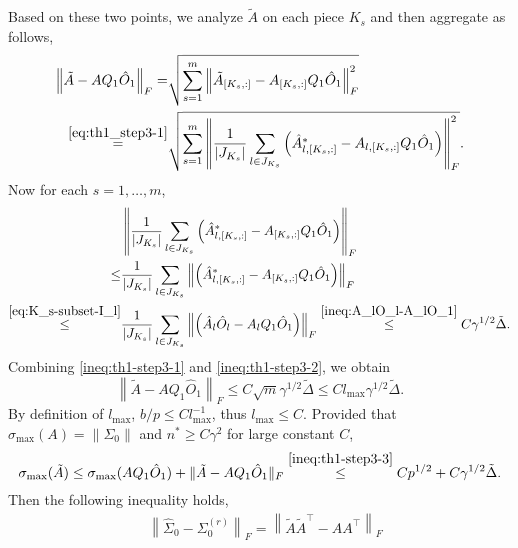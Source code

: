 \documentclass[11pt]{article}
\newcommand{\0}{{\mathbf{0}}}
\newcommand{\1}{{\mathbf{1}}}
\begin{document}
\begin{enumerate}[leftmargin=*]
	Based on these two points, we analyze $\tilde{A}$ on each piece $K_s$ and then aggregate as follows,
	\begin{equation}\label{ineq:th1-step3-1}
	\begin{split}
	\left\|\tilde{A} - A Q_1\hat{O}_1\right\|_F = & \sqrt{\sum_{s=1}^m \left\|\tilde{A}_{[K_s, :]} - A_{[K_s, :]} Q_1\hat{O}_1\right\|_F^2}\\
	\overset{\eqref{eq:th1_step3-1}}{=} & \sqrt{\sum_{s=1}^m \left\|\frac{1}{|J_{K_s}|} \sum_{l \in J_{K_s}} \left(\hat{A}_{l, [K_s, :]}^\ast - A_{l, [K_s, :]}Q_1\hat{O}_1\right)\right\|_F^2}.\\
	\end{split}
	\end{equation}
	Now for each $s = 1,\ldots, m$, 
	\begin{equation}\label{ineq:th1-step3-2}
	\begin{split}
	& \left\|\frac{1}{|J_{K_s}|} \sum_{l \in J_{K_s}} \left(\hat{A}_{l, [K_s, :]}^\ast - A_{[K_s, :]}Q_1\hat{O}_1\right)\right\|_F \\
	\leq & \frac{1}{|J_{K_s}|} \sum_{l\in J_{K_s}}\left\|\left(\hat{A}_{l, [K_s, :]}^\ast - A_{[K_s, :]}Q_1\hat{O}_1\right)\right\|_F\\
	\overset{\eqref{eq:K_s-subset-I_l}}{\leq} & \frac{1}{|J_{K_s}|} \sum_{l\in J_{K_s}}\left\|\left(\hat{A}_{l}\hat{O}_l - A_{l}Q_1\hat{O}_1\right)\right\|_F \overset{\eqref{ineq:A_lO_l-A_lO_1}}{\leq} C\gamma^{1/2}\tilde{\Delta}.
	\end{split}
	\end{equation}
	Combining \eqref{ineq:th1-step3-1} and \eqref{ineq:th1-step3-2}, we obtain
	\begin{equation}\label{ineq:th1-step3-3}
	\left\|\tilde{A} - AQ_1\hat{O}_1\right\|_F \leq C\sqrt{m} \gamma^{1/2}\tilde{\Delta} \leq Cl_{\max}\gamma^{1/2}\tilde{\Delta}.
	\end{equation}
	By definition of $l_{\max}$, $b/p \leq Cl_{\max}^{-1}$, thus $l_{\max}\leq C$. Provided that $\sigma_{\max}(A) = \|\Sigma_0\|$ and $n^\ast \geq C \gamma^2$ for large constant $C$,
	$$\sigma_{\max}(\tilde{A}) \leq \sigma_{\max}(AQ_1\hat{O}_1) + \|\tilde{A} - AQ_1\hat{O}_1\|_F \overset{\eqref{ineq:th1-step3-3}}{\leq} Cp^{1/2} + C\gamma^{1/2}\tilde{\Delta}.$$
	Then the following inequality holds,
	\begin{equation}
	\begin{split}
	& \left\|\hat{\Sigma}_0 - \Sigma_0^{(r)}\right\|_F = \left\|\tilde{A}\tilde{A}^\top - AA^\top \right\|_F \\

\end{split}
\end{equation}
\end{enumerate}
\end{document}
